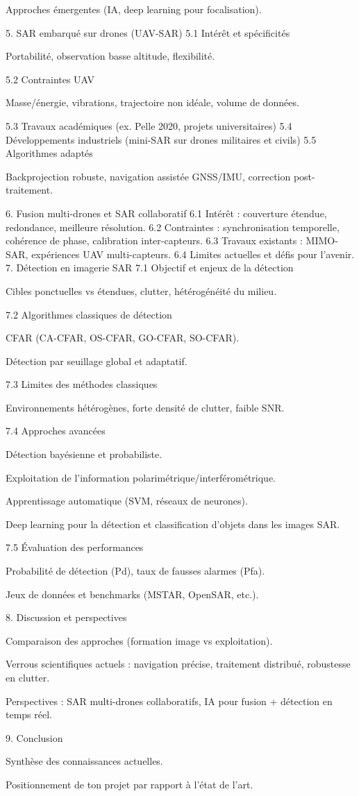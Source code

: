 Approches émergentes (IA, deep learning pour focalisation).

5. SAR embarqué sur drones (UAV-SAR)
5.1 Intérêt et spécificités

Portabilité, observation basse altitude, flexibilité.

5.2 Contraintes UAV

Masse/énergie, vibrations, trajectoire non idéale, volume de données.

5.3 Travaux académiques (ex. Pelle 2020, projets universitaires)
5.4 Développements industriels (mini-SAR sur drones militaires et civils)
5.5 Algorithmes adaptés

Backprojection robuste, navigation assistée GNSS/IMU, correction post-traitement.

6. Fusion multi-drones et SAR collaboratif
6.1 Intérêt : couverture étendue, redondance, meilleure résolution.
6.2 Contraintes : synchronisation temporelle, cohérence de phase, calibration inter-capteurs.
6.3 Travaux existants : MIMO-SAR, expériences UAV multi-capteurs.
6.4 Limites actuelles et défis pour l’avenir.
7. Détection en imagerie SAR
7.1 Objectif et enjeux de la détection

Cibles ponctuelles vs étendues, clutter, hétérogénéité du milieu.

7.2 Algorithmes classiques de détection

CFAR (CA-CFAR, OS-CFAR, GO-CFAR, SO-CFAR).

Détection par seuillage global et adaptatif.

7.3 Limites des méthodes classiques

Environnements hétérogènes, forte densité de clutter, faible SNR.

7.4 Approches avancées

Détection bayésienne et probabiliste.

Exploitation de l’information polarimétrique/interférométrique.

Apprentissage automatique (SVM, réseaux de neurones).

Deep learning pour la détection et classification d’objets dans les images SAR.

7.5 Évaluation des performances

Probabilité de détection (Pd), taux de fausses alarmes (Pfa).

Jeux de données et benchmarks (MSTAR, OpenSAR, etc.).

8. Discussion et perspectives

Comparaison des approches (formation image vs exploitation).

Verrous scientifiques actuels : navigation précise, traitement distribué, robustesse en clutter.

Perspectives : SAR multi-drones collaboratifs, IA pour fusion + détection en temps réel.

9. Conclusion

Synthèse des connaissances actuelles.

Positionnement de ton projet par rapport à l’état de l’art.






